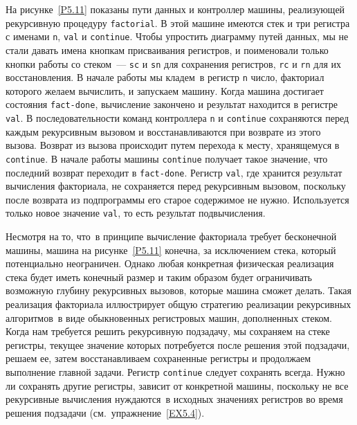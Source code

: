 На рисунке~\ref{P5.11} показаны пути данных и
контроллер машины, реализующей рекурсивную процедуру
{\tt factorial}. В этой машине имеются стек и три регистра с
именами {\tt n}, {\tt val} и {\tt continue}.
Чтобы упростить диаграмму путей данных, мы не стали давать имена
кнопкам присваивания регистров, и поименовали только кнопки работы со
стеком~--- {\tt sc} и {\tt sn} для сохранения регистров,
{\tt rc} и {\tt rn} для их восстановления.  В начале работы
мы кладем~в регистр {\tt n} число, факториал которого
желаем вычислить, и запускаем машину.  Когда машина достигает состояния
{\tt fact-done}, вычисление закончено и результат находится в
регистре {\tt val}.  В последовательности команд контроллера
{\tt n} и {\tt continue} сохраняются перед каждым
рекурсивным вызовом и восстанавливаются при возврате из этого вызова.
Возврат из вызова происходит путем перехода к месту, хранящемуся в
{\tt continue}.  В начале работы машины {\tt continue}
получает такое значение, что последний возврат переходит в
{\tt fact-done}.  Регистр {\tt val}, где хранится
результат вычисления факториала, не сохраняется перед рекурсивным
вызовом, поскольку после возврата из подпрограммы его старое содержимое
не нужно.  Используется только новое значение {\tt val}, то есть
результат подвычисления.

Несмотря на то, что~в принципе вычисление факториала
требует бесконечной машины, машина на рисунке~\ref{P5.11}
конечна, за исключением стека, который потенциально неограничен.
Однако любая конкретная физическая реализация стека будет иметь
конечный размер и таким образом будет ограничивать возможную глубину
рекурсивных вызовов, которые машина сможет делать.  Такая реализация
факториала иллюстрирует общую стратегию реализации рекурсивных
алгоритмов~в виде обыкновенных регистровых машин, дополненных стеком.
Когда нам требуется решить рекурсивную подзадачу, мы сохраняем на
стеке регистры, текущее значение которых потребуется после решения
этой подзадачи, решаем ее, затем восстанавливаем сохраненные регистры
и продолжаем выполнение главной задачи. Регистр {\tt continue}
следует сохранять всегда.  Нужно ли сохранять другие регистры, зависит
от конкретной машины, поскольку не все рекурсивные вычисления
нуждаются~в исходных значениях регистров во время решения подзадачи
(см.~упражнение~\ref{EX5.4}).


